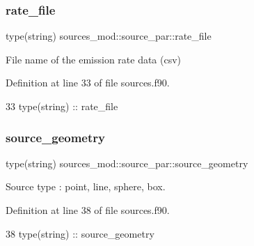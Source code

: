 \subsubsection{\texorpdfstring{rate\+\_\+file}{rate\_file}}
{\footnotesize\ttfamily type(string) sources\+\_\+mod\+::source\+\_\+par\+::rate\+\_\+file\hspace{0.3cm}{\ttfamily [private]}}



File name of the emission rate data (csv) 



Definition at line 33 of file sources.\+f90.


\begin{DoxyCode}
33         \textcolor{keywordtype}{type}(string) :: rate\_file
\end{DoxyCode}
\mbox{\label{structsources__mod_1_1source__par_a66e7627f128290f25c2c9eb36808eb5b}} 
\subsubsection{\texorpdfstring{source\+\_\+geometry}{source\_geometry}}
{\footnotesize\ttfamily type(string) sources\+\_\+mod\+::source\+\_\+par\+::source\+\_\+geometry\hspace{0.3cm}{\ttfamily [private]}}



Source type \+: \textquotesingle{}point\textquotesingle{}, \textquotesingle{}line\textquotesingle{}, \textquotesingle{}sphere\textquotesingle{}, \textquotesingle{}box\textquotesingle{}. 



Definition at line 38 of file sources.\+f90.


\begin{DoxyCode}
38         \textcolor{keywordtype}{type}(string) :: source\_geometry
\end{DoxyCode}
\mbox{\label{structsources__mod_1_1source__par_a86f38cfdf7cd0bc42a72785aca69b9f9}} 
